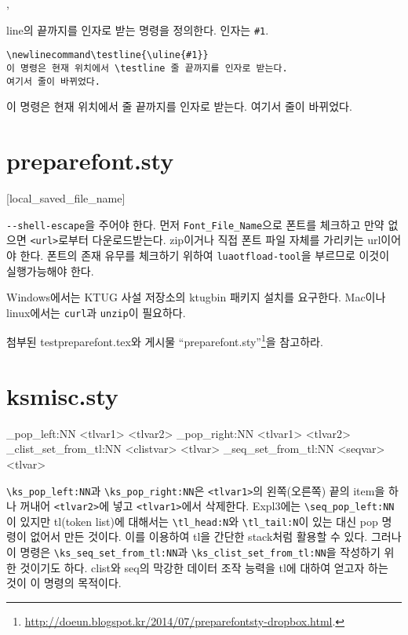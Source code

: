 \documentclass[nanum,b5paper]{oblivoir}
\begin{document}
\bigskip 

\begin{boxedverbatim}
\newlinecommand, \renewlinecommand
\end{boxedverbatim}

line의 끝까지를 인자로 받는 명령을 정의한다. 인자는 \verb|#1|.
\begin{verbatim}
\newlinecommand\testline{\uline{#1}}
이 명령은 현재 위치에서 \testline 줄 끝까지를 인자로 받는다.
여기서 줄이 바뀌었다.
\end{verbatim}
\newlinecommand{}
이 명령은 현재 위치에서 \testline 줄 끝까지를 인자로 받는다.
여기서 줄이 바뀌었다.

\section{preparefont.sty}

\begin{boxedverbatim}
[local_saved_file_name]
\end{boxedverbatim}

\verb|--shell-escape|을 주어야 한다. 먼저 \verb|Font_File_Name|으로 폰트를 체크하고 만약 없으면 \verb|<url>|로부터 다운로드받는다. zip이거나 직접 폰트 파일 자체를 가리키는 url이어야 한다.
폰트의 존재 유무를 체크하기 위하여 \verb|luaotfload-tool|을 부르므로 이것이 실행가능해야 한다.

Windows에서는 KTUG 사설 저장소의 ktugbin 패키지 설치를 요구한다.
Mac이나 linux에서는 \verb|curl|과 \verb|unzip|이 필요하다.

첨부된 testpreparefont.tex와 게시물 ``preparefont.sty''\footnote{\url{http://doeun.blogspot.kr/2014/07/preparefontsty-dropbox.html}.}을 참고하라.

\section{ksmisc.sty}

\begin{boxedverbatim}
\ks_pop_left:NN <tlvar1> <tlvar2>
\ks_pop_right:NN <tlvar1> <tlvar2>
\ks_clist_set_from_tl:NN <clistvar> <tlvar>
\ks_seq_set_from_tl:NN <seqvar> <tlvar>
\end{boxedverbatim}

\verb|\ks_pop_left:NN|과 \verb|\ks_pop_right:NN|은 \verb|<tlvar1>|의 왼쪽(오른쪽) 끝의 item을
하나 꺼내어 \verb|<tlvar2>|에 넣고 \verb|<tlvar1>|에서 삭제한다.
Expl3에는 \verb|\seq_pop_left:NN|이 있지만 tl(token list)에 대해서는 \verb|\tl_head:N|와 \verb|\tl_tail:N|이 있는 대신 pop 명령이 없어서 만든 것이다. 이를 이용하여 tl을 간단한 stack처럼 활용할 수 있다.
그러나 이 명령은 \verb|\ks_seq_set_from_tl:NN|과 \verb|\ks_clist_set_from_tl:NN|을 작성하기 위한 것이기도 하다. clist와 seq의 막강한 데이터 조작 능력을 tl에 대하여 얻고자 하는 것이 이 명령의 목적이다.
\end{document}
